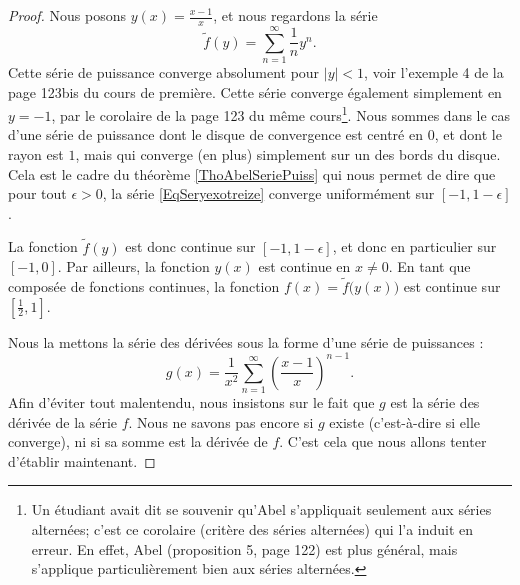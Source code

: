 \begin{proof}
	Nous posons \( y(x)=\frac{ x-1 }{ x }\), et nous regardons la série
	\begin{equation}		\label{EqSeryexotreize}
		\tilde f(y)=\sum_{n=1}^{\infty}\frac{1}{ n }y^n.
	\end{equation}
	Cette série de puissance converge absolument pour \( | y |<1\), voir l'exemple 4 de la page 123bis du cours de première. Cette série converge également simplement en \( y=-1\), par le corolaire de la page 123 du même cours\footnote{Un étudiant avait dit se souvenir qu'Abel s'appliquait seulement aux séries alternées; c'est ce corolaire (critère des séries alternées) qui l'a induit en erreur. En effet, Abel (proposition 5, page 122) est plus général, mais s'applique particulièrement bien aux séries alternées.}. Nous sommes dans le cas d'une série de puissance dont le disque de convergence est centré en \( 0\), et dont le rayon est \( 1\), mais qui converge (en plus) simplement sur un des bords du disque. Cela est le cadre du théorème \ref{ThoAbelSeriePuiss} qui nous permet de dire que pour tout \( \epsilon>0\), la série \eqref{EqSeryexotreize} converge uniformément sur \( [-1,1-\epsilon]\).

	La fonction \( \tilde f(y)\) est donc continue sur \( [-1,1-\epsilon]\), et donc en particulier sur \( [-1,0]\). Par ailleurs, la fonction \( y(x)\) est continue en \( x\neq 0\). En tant que composée de fonctions continues, la fonction \( f(x)=\tilde f\big( y(x) \big)\) est continue sur \( [\frac{ 1 }{2},1]\).

	Nous la mettons la série des dérivées sous la forme d'une série de puissances :
	\begin{equation}		\label{EqSerieDerrTreize}
		g(x)=\frac{1}{ x^2 }\sum_{n=1}^{\infty} \left( \frac{ x-1 }{ x } \right)^{n-1}.
	\end{equation}
	Afin d'éviter tout malentendu, nous insistons sur le fait que \( g\) est la série des dérivée de la série \( f\). Nous ne savons pas encore si \( g\) existe (c'est-à-dire si elle converge), ni si sa somme est la dérivée de \( f\). C'est cela que nous allons tenter d'établir maintenant.


\end{proof}
